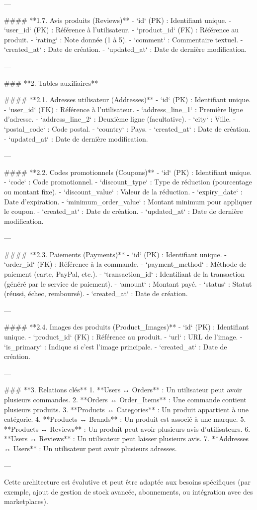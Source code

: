 ---

#### **1.7. Avis produits (Reviews)**
- `id` (PK) : Identifiant unique.
- `user_id` (FK) : Référence à l'utilisateur.
- `product_id` (FK) : Référence au produit.
- `rating` : Note donnée (1 à 5).
- `comment` : Commentaire textuel.
- `created_at` : Date de création.
- `updated_at` : Date de dernière modification.

---

### **2. Tables auxiliaires**

#### **2.1. Adresses utilisateur (Addresses)**
- `id` (PK) : Identifiant unique.
- `user_id` (FK) : Référence à l'utilisateur.
- `address_line_1` : Première ligne d'adresse.
- `address_line_2` : Deuxième ligne (facultative).
- `city` : Ville.
- `postal_code` : Code postal.
- `country` : Pays.
- `created_at` : Date de création.
- `updated_at` : Date de dernière modification.

---

#### **2.2. Codes promotionnels (Coupons)**
- `id` (PK) : Identifiant unique.
- `code` : Code promotionnel.
- `discount_type` : Type de réduction (pourcentage ou montant fixe).
- `discount_value` : Valeur de la réduction.
- `expiry_date` : Date d'expiration.
- `minimum_order_value` : Montant minimum pour appliquer le coupon.
- `created_at` : Date de création.
- `updated_at` : Date de dernière modification.

---

#### **2.3. Paiements (Payments)**
- `id` (PK) : Identifiant unique.
- `order_id` (FK) : Référence à la commande.
- `payment_method` : Méthode de paiement (carte, PayPal, etc.).
- `transaction_id` : Identifiant de la transaction (généré par le service de paiement).
- `amount` : Montant payé.
- `status` : Statut (réussi, échec, remboursé).
- `created_at` : Date de création.

---

#### **2.4. Images des produits (Product_Images)**
- `id` (PK) : Identifiant unique.
- `product_id` (FK) : Référence au produit.
- `url` : URL de l’image.
- `is_primary` : Indique si c’est l’image principale.
- `created_at` : Date de création.

---

### **3. Relations clés**
1. **Users ↔ Orders** : Un utilisateur peut avoir plusieurs commandes.  
2. **Orders ↔ Order_Items** : Une commande contient plusieurs produits.  
3. **Products ↔ Categories** : Un produit appartient à une catégorie.  
4. **Products ↔ Brands** : Un produit est associé à une marque.  
5. **Products ↔ Reviews** : Un produit peut avoir plusieurs avis d'utilisateurs.  
6. **Users ↔ Reviews** : Un utilisateur peut laisser plusieurs avis.  
7. **Addresses ↔ Users** : Un utilisateur peut avoir plusieurs adresses.  

---

Cette architecture est évolutive et peut être adaptée aux besoins spécifiques (par exemple, ajout de gestion de stock avancée, abonnements, ou intégration avec des marketplaces).